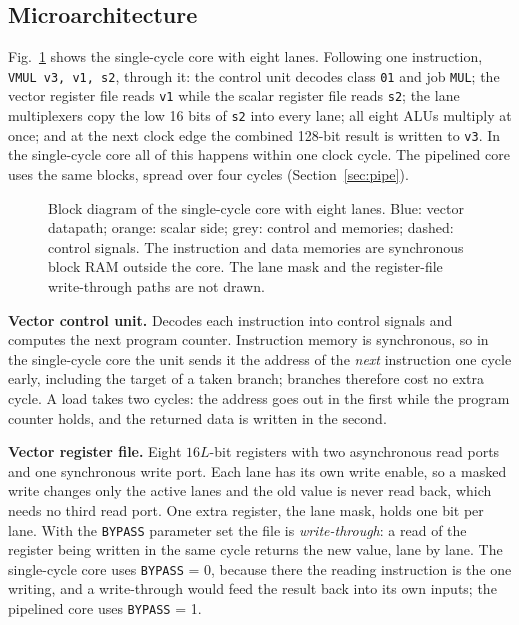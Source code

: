 \subsection{Microarchitecture}\label{sec:micro}
Fig.~\ref{fig:block} shows the single-cycle core with eight lanes. Following one
instruction, \texttt{VMUL v3, v1, s2}, through it: the control unit decodes class
\texttt{01} and job \texttt{MUL}; the vector register file reads \texttt{v1} while the
scalar register file reads \texttt{s2}; the lane multiplexers copy the low 16 bits of
\texttt{s2} into every lane; all eight ALUs multiply at once; and at the next clock edge
the combined 128-bit result is written to \texttt{v3}. In the single-cycle core all of
this happens within one clock cycle. The pipelined core uses the same blocks, spread over
four cycles (Section~\ref{sec:pipe}).

\begin{figure}[t]
\centering

\caption{Block diagram of the single-cycle core with eight lanes. Blue: vector
datapath; orange: scalar side; grey: control and memories; dashed: control signals. The
instruction and data memories are synchronous block RAM outside the core. The lane mask
and the register-file write-through paths are not drawn.}
\label{fig:block}
\end{figure}

\textbf{Vector control unit.} Decodes each instruction into control signals and
computes the next program counter. Instruction memory is synchronous, so in the
single-cycle core the unit sends it the address of the \emph{next} instruction one cycle
early, including the target of a taken branch; branches therefore cost no extra cycle.
A load takes two cycles: the address goes out in the first while the program counter
holds, and the returned data is written in the second.

\textbf{Vector register file.} Eight $16L$-bit registers with two asynchronous read
ports and one synchronous write port. Each lane has its own write enable, so a masked
write changes only the active lanes and the old value is never read back, which needs
no third read port. One extra register, the lane mask, holds one bit per lane. With the
\texttt{BYPASS} parameter set the file is \emph{write-through}: a read of the register
being written in the same cycle returns the new value, lane by lane. The single-cycle
core uses \texttt{BYPASS} = 0, because there the reading instruction is the one
writing, and a write-through would feed the result back into its own inputs; the
pipelined core uses \texttt{BYPASS} = 1.


